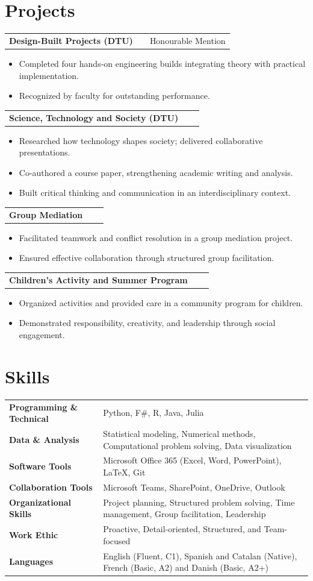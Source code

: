 \documentclass[a4paper,12pt]{article}
\makeatletter
\newenvironment{joblong}[2]
    {
    \begin{tabularx}{\linewidth}{@{}l X r@{}}
    \textbf{#1} & \hfill &  #2 \\[3.75pt]
    \end{tabularx}
    \begin{minipage}[t]{\linewidth}
    \begin{itemize}[nosep,after=\strut, leftmargin=1em, itemsep=3pt,label=--]
    }
    {
    \end{itemize}
    \end{minipage}    
    }
\makeatother
\begin{document}
\section{Projects}
\begin{joblong}{Design-Built Projects (DTU)}{Honourable Mention}
  \item Completed four hands-on engineering builds integrating theory with practical implementation.
  \item Recognized by faculty for outstanding performance.
\end{joblong}
\begin{joblong}{Science, Technology and Society (DTU)}{}
  \item Researched how technology shapes society; delivered collaborative presentations.
  \item Co-authored a course paper, strengthening academic writing and analysis.
  \item Built critical thinking and communication in an interdisciplinary context.
\end{joblong}
\begin{joblong}{Group Mediation}{}
  \item Facilitated teamwork and conflict resolution in a group mediation project.
  \item Ensured effective collaboration through structured group facilitation.
\end{joblong}
\begin{joblong}{Children's Activity and Summer Program}{}
  \item Organized activities and provided care in a community program for children.
  \item Demonstrated responsibility, creativity, and leadership through social engagement.
\end{joblong}
\section{Skills}
\begin{tabularx}{\linewidth}{@{}l X@{}}
\textbf{Programming \& Technical} & Python, F\#, R, Java, Julia\\
\textbf{Data \& Analysis} & \normalsize{Statistical modeling, Numerical methods, Computational problem solving, Data visualization} \\
\textbf{Software Tools} & Microsoft Office 365 (Excel, Word, PowerPoint), LaTeX, Git \\
\textbf{Collaboration Tools} & Microsoft Teams, SharePoint, OneDrive, Outlook \\
\textbf{Organizational Skills} & Project planning, Structured problem solving, Time management, Group facilitation, Leadership \\
\textbf{Work Ethic} & Proactive, Detail-oriented, Structured, and Team-focused \\
\textbf{Languages} & \normalsize{English (Fluent, C1), Spanish and Catalan (Native), French (Basic, A2) and Danish (Basic, A2+)} \\
\end{tabularx}
\end{document}
